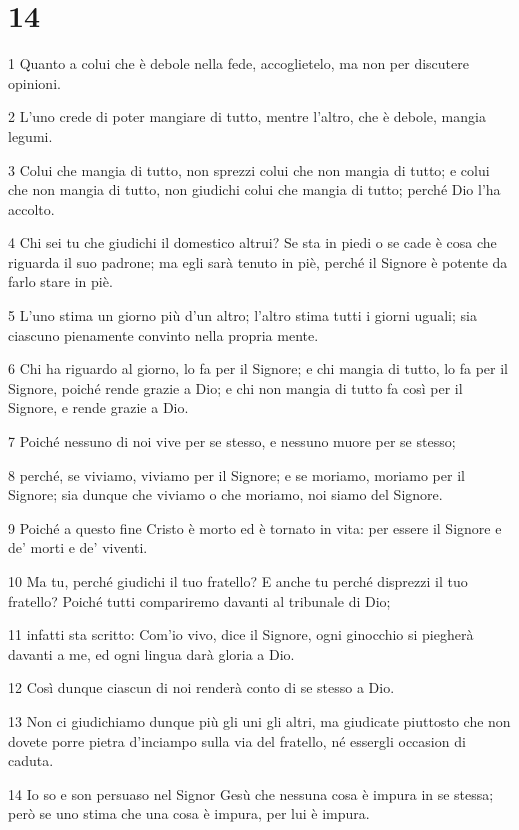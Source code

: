 \chapter{14}

\par 1 Quanto a colui che è debole nella fede, accoglietelo, ma non per discutere opinioni.
\par 2 L'uno crede di poter mangiare di tutto, mentre l'altro, che è debole, mangia legumi.
\par 3 Colui che mangia di tutto, non sprezzi colui che non mangia di tutto; e colui che non mangia di tutto, non giudichi colui che mangia di tutto; perché Dio l'ha accolto.
\par 4 Chi sei tu che giudichi il domestico altrui? Se sta in piedi o se cade è cosa che riguarda il suo padrone; ma egli sarà tenuto in piè, perché il Signore è potente da farlo stare in piè.
\par 5 L'uno stima un giorno più d'un altro; l'altro stima tutti i giorni uguali; sia ciascuno pienamente convinto nella propria mente.
\par 6 Chi ha riguardo al giorno, lo fa per il Signore; e chi mangia di tutto, lo fa per il Signore, poiché rende grazie a Dio; e chi non mangia di tutto fa così per il Signore, e rende grazie a Dio.
\par 7 Poiché nessuno di noi vive per se stesso, e nessuno muore per se stesso;
\par 8 perché, se viviamo, viviamo per il Signore; e se moriamo, moriamo per il Signore; sia dunque che viviamo o che moriamo, noi siamo del Signore.
\par 9 Poiché a questo fine Cristo è morto ed è tornato in vita: per essere il Signore e de' morti e de' viventi.
\par 10 Ma tu, perché giudichi il tuo fratello? E anche tu perché disprezzi il tuo fratello? Poiché tutti compariremo davanti al tribunale di Dio;
\par 11 infatti sta scritto: Com'io vivo, dice il Signore, ogni ginocchio si piegherà davanti a me, ed ogni lingua darà gloria a Dio.
\par 12 Così dunque ciascun di noi renderà conto di se stesso a Dio.
\par 13 Non ci giudichiamo dunque più gli uni gli altri, ma giudicate piuttosto che non dovete porre pietra d'inciampo sulla via del fratello, né essergli occasion di caduta.
\par 14 Io so e son persuaso nel Signor Gesù che nessuna cosa è impura in se stessa; però se uno stima che una cosa è impura, per lui è impura.
